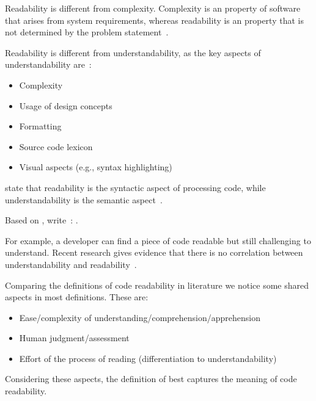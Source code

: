 \documentclass[%
class=scrreprt,
chapterprefix=false,%
open=right,%
twoside=true,%
paper=a4,%
logofile={Logo\_zentral\_farbig\_EN.png},%
thesistype=master,%
UKenglish,%
]{se2thesis}
\theoremstyle{definition}
\begin{document}
	Readability is different from complexity. Complexity is an  property of software that arises
	from system requirements, whereas readability is an  property that is not determined by the problem statement~\cite{buse2009learning, brooks1987no}.
	
	Readability is different from understandability, as the key aspects of understandability are~\cite{scalabrino2018comprehensive, martin2009clean, wilson2007beautiful, beck2007implementation}:
	\begin{itemize}
		\item Complexity
		\item Usage of design concepts
		\item Formatting
		\item Source code lexicon
		\item Visual aspects (e.g., syntax highlighting)
	\end{itemize}
	
	\citeauthor{posnett2011simpler} state that readability is the syntactic aspect of processing code, while understandability is the semantic aspect~\cite{posnett2011simpler}.
	
	Based on \citeauthor{posnett2011simpler}, \citeauthor{scalabrino2018comprehensive} write~\cite{scalabrino2018comprehensive}:
	.
		
	For example, a developer can find a piece of code readable but still challenging to understand. Recent research gives evidence that there is no correlation between understandability and readability~\cite{scalabrino2017automatically}.	
	
	Comparing the definitions of code readability in literature we notice some shared aspects in most definitions. These are:
	\begin{itemize}
		\item Ease/complexity of understanding/comprehension/apprehension
		\item Human judgment/assessment
		\item Effort of the process of reading (differentiation to understandability)
	\end{itemize}
	
	Considering these aspects, the definition of \citeauthor{oliveira2020evaluating} best captures the meaning of code readability.
	
\end{document}
